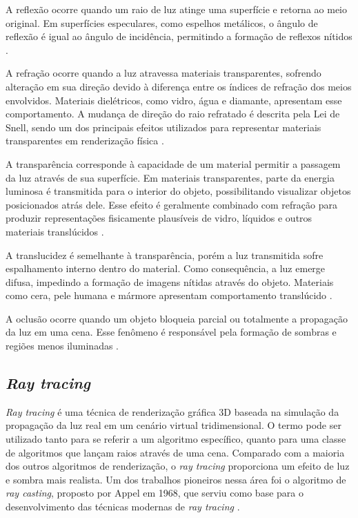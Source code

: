 A reflexão ocorre quando um raio de luz atinge uma superfície e retorna ao meio original. Em superfícies especulares, como espelhos metálicos, o ângulo de reflexão é igual ao ângulo de incidência, permitindo a formação de reflexos nítidos \cite{marschner2021fundamentals}.

A refração ocorre quando a luz atravessa materiais transparentes, sofrendo alteração em sua direção devido à diferença entre os índices de refração dos meios envolvidos. Materiais dielétricos, como vidro, água e diamante, apresentam esse comportamento. A mudança de direção do raio refratado é descrita pela Lei de Snell, sendo um dos principais efeitos utilizados para representar materiais transparentes em renderização física \cite{marschner2021fundamentals}.

A transparência corresponde à capacidade de um material permitir a passagem da luz através de sua superfície. Em materiais transparentes, parte da energia luminosa é transmitida para o interior do objeto, possibilitando visualizar objetos posicionados atrás dele. Esse efeito é geralmente combinado com refração para produzir representações fisicamente plausíveis de vidro, líquidos e outros materiais translúcidos \cite{akenine2019real}.

A translucidez é semelhante à transparência, porém a luz transmitida sofre espalhamento interno dentro do material. Como consequência, a luz emerge difusa, impedindo a formação de imagens nítidas através do objeto. Materiais como cera, pele humana e mármore apresentam comportamento translúcido \cite{akenine2019real}.

A oclusão ocorre quando um objeto bloqueia parcial ou totalmente a propagação da luz em uma cena. Esse fenômeno é responsável pela formação de sombras e regiões menos iluminadas \cite{marschner2021fundamentals}.




\subsection{\textit{Ray tracing}}

\textit{Ray tracing} é uma técnica de renderização gráfica 3D baseada na simulação da propagação da luz real em um cenário virtual tridimensional. O termo pode ser utilizado tanto para se referir a um algoritmo específico, quanto para uma classe de algoritmos que lançam raios através de uma cena. Comparado com a maioria dos outros algoritmos de renderização, o \textit{ray tracing} proporciona um efeito de luz e sombra mais realista. Um dos trabalhos pioneiros nessa área foi o algoritmo de \textit{ray casting}, proposto por Appel em 1968, que serviu como base para o desenvolvimento das técnicas modernas de \textit{ray tracing} \cite{wang2022development}.

